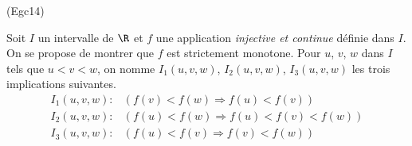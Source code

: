 \begin{tiny}(Egc14)\end{tiny}\label{exo:Egc14}
Soit $I$ un intervalle de $\R$ et $f$ une application \emph{injective et continue} définie dans $I$. On se propose de montrer que $f$ est strictement monotone.\newline
Pour $u$, $v$, $w$ dans $I$ tels que $u<v<w$, on nomme $I_1(u,v,w)$, $I_2(u,v,w)$, $I_3(u,v,w)$ les trois implications suivantes.
\begin{align*}
 I_1(u,v,w):  &\left( f(v)<f(w) \Rightarrow f(u)<f(v) \right) \\
 I_2(u,v,w):  &\left( f(u)<f(w) \Rightarrow f(u)<f(v)<f(w)\right)  \\
 I_3(u,v,w):  &\left( f(u)<f(v) \Rightarrow f(v)<f(w) \right) 
\end{align*}

